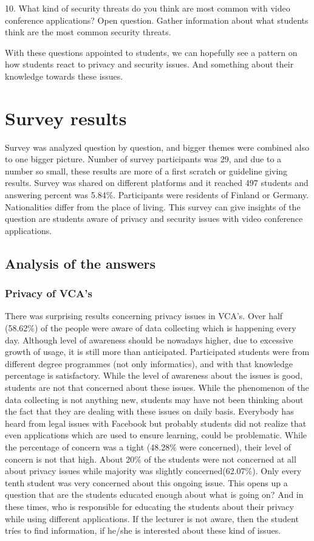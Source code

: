 \documentclass[utf8,english]{gradu3}
\begin{document}
10. What kind of security threats do you think are most common with video conference applications? Open question. Gather information about what students think are the most common security threats.

With these questions appointed to students, we can hopefully see a pattern on how students react to privacy and security issues. And something about their knowledge towards these issues. 

\chapter{Survey results}
\label{surveyresults}
Survey was analyzed question by question, and bigger themes were combined also to one bigger picture. Number of survey participants was 29, and due to a number so small, these results are more of a first scratch or guideline giving results. Survey was shared on different platforms and it reached 497 students and answering percent was 5.84\%. Participants were residents of Finland or Germany. Nationalities differ from the place of living. This survey can give insights of the question are students aware of privacy and security issues with video conference applications.

\section{Analysis of the answers}
\subsection{Privacy of VCA's}
There was surprising results concerning privacy issues in VCA's. Over half (58.62\%) of the people were aware of data collecting which is happening every day. Although level of awareness should be nowadays higher, due to excessive growth of usage, it is still more than anticipated. Participated students were from different degree programmes (not only informatics), and with that knowledge percentage is satisfactory. While the level of awareness about the issues is good, students are not that concerned about these issues. While the phenomenon of the data collecting is not anything new, students may have not been thinking about the fact that they are dealing with these issues on daily basis. Everybody has heard from legal issues with Facebook\parencite{fbData} but probably students did not realize that even applications which are used to ensure learning, could be problematic. While the percentage of concern was a tight (48.28\% were concerned), their level of concern is not that high. About 20\% of the students were not concerned at all about privacy issues while majority was slightly concerned(62.07\%). Only every tenth student was very concerned about this ongoing issue. This opens up a question that are the students educated enough about what is going on? And in these times, who is responsible for educating the students about their privacy while using different applications. If the lecturer is not aware, then the student tríes to find information, if he/she is interested about these kind of issues. 
\end{document}
